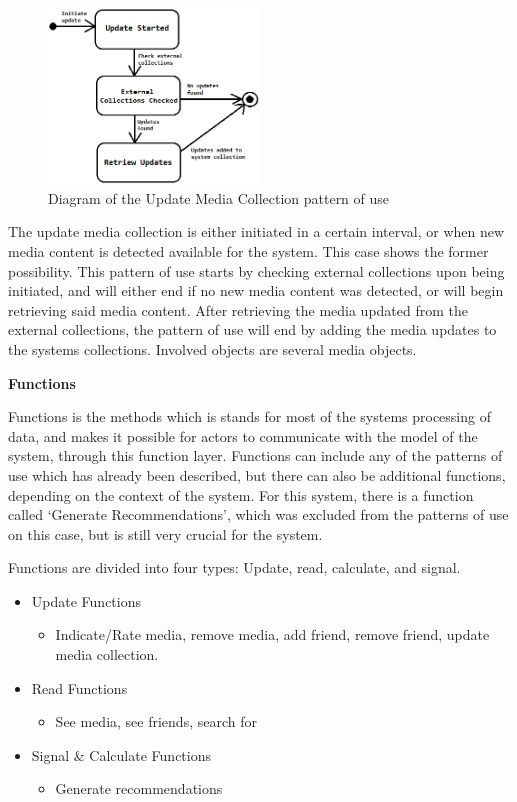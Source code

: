 \begin{figure}[htb]
\centering
\includegraphics[width=0.5\textwidth]{Images/UpdateCollection.png}
\caption{Diagram of the Update Media Collection pattern of use}
\label{UpdateCollection}
\end{figure}

The update media collection is either initiated in a certain interval, or when new media content is detected available for the system. This case shows the former possibility. This pattern of use starts by checking external collections upon being initiated, and will either end if no new media content was detected, or will begin retrieving said media content. After retrieving the media updated from the external collections, the pattern of use will end by adding the media updates to the systems collections. Involved objects are several media objects.

\textbf{Functions}

Functions is the methods which is stands for most of the systems processing of data, and makes it possible for actors to communicate with the model of the system, through this function layer. Functions can include any of the patterns of use which has already been described, but there can also be additional functions, depending on the context of the system. For this system, there is a function called ‘Generate Recommendations’, which was excluded from the patterns of use on this case, but is still very crucial for the system. 

Functions are divided into four types: Update, read, calculate, and signal.
\begin{itemize}
	\item Update Functions
	\begin{itemize}
		\item Indicate/Rate media, remove media, add friend, remove friend, update media collection.
	\end{itemize}
	\item Read Functions
	\begin{itemize}
		\item See media, see friends, search for
	\end{itemize}
	\item Signal \& Calculate Functions
	\begin{itemize}
		\item Generate recommendations
	\end{itemize}
\end{itemize}

